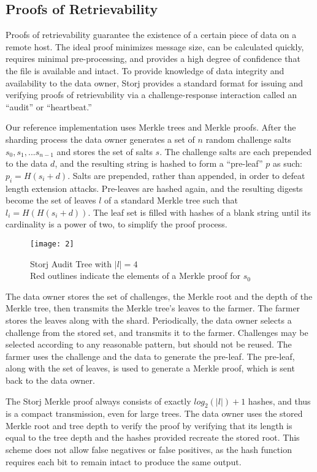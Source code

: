 \documentclass[a4paper,10pt]{article}
\begin{document}
\subsection{Proofs of Retrievability}
Proofs of retrievability guarantee the existence of a certain piece of data on a
remote host. The ideal proof minimizes message size, can be calculated quickly,
requires minimal pre-processing, and provides a high degree of confidence that
the file is available and intact. To provide knowledge of data integrity and
availability to the data owner, Storj provides a standard format for issuing and
verifying proofs of retrievability via a challenge-response interaction called
an “audit” or “heartbeat.”

Our reference implementation uses Merkle trees \cite{5} and Merkle proofs. After
the sharding process the data owner generates a set of $ n $ random challenge
salts $ s_{0}, s_{1}, ... s_{n-1} $ and stores the set of salts $ s $. The
challenge salts are each prepended to the data $ d $, and the resulting string
is hashed to form a “pre-leaf” $ p $ as such: $ p_{i} = H(s_{i} + d) $. Salts
are prepended, rather than appended, in order to defeat length extension
attacks. Pre-leaves are hashed again, and the resulting digests become the set
of leaves $ l $ of a standard Merkle tree such that $ l_{i} = H(H(s_{i} + d)) $.
The leaf set is filled with hashes of a blank string until its cardinality is a
power of two, to simplify the proof process.

\begin{figure}[hbt]
\centering
\texttt{[image: 2]}
\caption{Storj Audit Tree with $ |l| = 4 $\\Red outlines indicate the elements
of a Merkle proof for $ s_{0} $}
\end{figure}

The data owner stores the set of challenges, the Merkle root and the depth of
the Merkle tree, then transmits the Merkle tree’s leaves to the farmer. The
farmer stores the leaves along with the shard. Periodically, the data owner
selects a challenge from the stored set, and transmits it to the farmer.
Challenges may be selected according to any reasonable pattern, but should not
be reused. The farmer uses the challenge and the data to generate the pre-leaf.
The pre-leaf, along with the set of leaves, is used to generate a Merkle proof,
which is sent back to the data owner.

The Storj Merkle proof always consists of exactly $ log_{2}(|l|)+1 $ hashes, and
thus is a compact transmission, even for large trees. The data owner uses the
stored Merkle root and tree depth to verify the proof by verifying that its
length is equal to the tree depth and the hashes provided recreate the stored
root. This scheme does not allow false negatives or false positives, as the hash
function requires each bit to remain intact to produce the same output.
\end{document}

